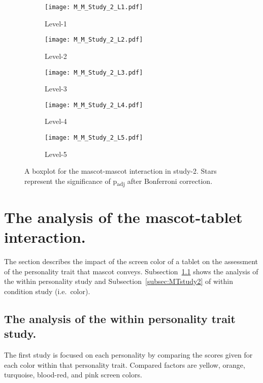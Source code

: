 \begin{figure}[hbt!]
    \centering
    \begin{subfigure}{.45\textwidth}
        \centering
        \texttt{[image: M\_M\_Study\_2\_L1.pdf]}
        \caption{Level-1}
        \label{fig:sub1}
    \end{subfigure}\hfill%
    \begin{subfigure}{.45\textwidth}
        \centering
        \texttt{[image: M\_M\_Study\_2\_L2.pdf]}
        \caption{Level-2}
        \label{fig:sub2}
    \end{subfigure}\hfill
    \begin{subfigure}{.45\textwidth}
        \centering
        \texttt{[image: M\_M\_Study\_2\_L3.pdf]}
        \caption{Level-3}
        \label{fig:sub1}
    \end{subfigure}\hfill%
    \begin{subfigure}{.45\textwidth}
        \centering
        \texttt{[image: M\_M\_Study\_2\_L4.pdf]}
        \caption{Level-4}
        \label{fig:sub1}
    \end{subfigure}\hfill%
    \begin{subfigure}{.45\textwidth}
        \centering
        \texttt{[image: M\_M\_Study\_2\_L5.pdf]}
        \caption{Level-5}
        \label{fig:sub1}
    \end{subfigure}\hfill%
    \caption{A boxplot for the mascot-mascot interaction in study-2.
    Stars represent the significance of p\textsubscript{adj} after Bonferroni correction.}
    \label{fig:MM2}
\end{figure}
\section{The analysis of the mascot-tablet interaction.}
\label{sec:m-t}
The section describes the impact of the screen color of a tablet on the assessment of the
personality trait that mascot conveys.
Subsection~\ref{subsec:MTstudy1} shows the analysis of the within personality study
and Subsection~\ref{subsec:MTstudy2} of within condition study (i.e.\ color).

\subsection{The analysis of the within personality trait study.}
\label{subsec:MTstudy1}
The first study is focused on each personality by comparing the scores given
for each color within that personality trait.
Compared factors are yellow, orange, turquoise, blood-red, and pink screen colors.

